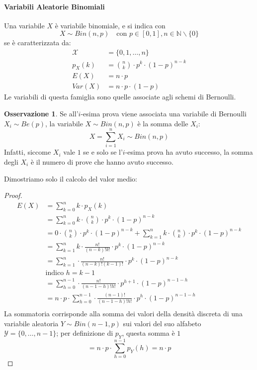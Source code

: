 \documentclass{article}
\theoremstyle{plain}
\theoremstyle{definition}
\newtheorem{osservazione}{Osservazione}[section]
\theoremstyle{remark}
\begin{document}
\paragraph{Variabili Aleatorie Binomiali} %
\label{par:variabili_aleatorie_binomiali}
Una variabile $X$ è variabile binomiale, e si indica con
\begin{equation*}
	X\sim Bin(n,p)\quad\text{con }p\in[0,1],n\in\mathds{N}\smallsetminus\{0\}
\end{equation*}
se è caratterizzata da:
\begin{align*}
	\mathcal{X}&=\{0,1,\dots,n\}\\
	p_X(k)&=\binom{n}{k}\cdot p^k\cdot (1-p)^{n-k}\\
	E(X)&=n\cdot p\\
	Var(X)&=n\cdot p\cdot(1-p)
\end{align*}
Le variabili di questa famiglia sono quelle associate agli schemi di Bernoulli.
\begin{osservazione}
	Se all'$i$-esima prova viene associata una variabile di Bernoulli $X_i\sim Be(p)$, la variabile $X\sim Bin(n,p)$ è la somma delle $X_i$:
	\begin{equation*}
		X=\sum_{i=1}^n X_i\sim Bin(n,p)
	\end{equation*}
	Infatti, siccome $X_i$ vale $1$ se e solo se l'$i$-esima prova ha avuto successo, la somma degli $X_i$ è il numero di prove che hanno avuto successo.
\end{osservazione}
Dimostriamo solo il calcolo del valor medio:
\begin{proof}
	\begin{align*}
		E(X)&=\sum_{k=0}^n k\cdot p_X(k)\\
		&=\sum_{k=0}^n k\cdot\binom{n}{k}\cdot p^k\cdot (1-p)^{n-k}\\
		&=0\cdot\binom{n}{k}\cdot p^k\cdot (1-p)^{n-k}+\sum_{k=1}^n k\cdot\binom{n}{k}\cdot p^k\cdot (1-p)^{n-k}\\
		&=\sum_{k=1}^n k\cdot\frac{n!}{(n-k)!k!}\cdot p^k\cdot (1-p)^{n-k}\\
		&=\sum_{k=1}^n \cdot\frac{n!}{(n-k)!(k-1)!}\cdot p^k\cdot (1-p)^{n-k}\\
		&\text{indico $h=k-1$}\\
		&=\sum_{h=0}^{n-1} \cdot\frac{n!}{(n-1-h)!h!}\cdot p^{h+1}\cdot (1-p)^{n-1-h}\\
		&=n\cdot p\cdot\sum_{h=0}^{n-1} \cdot\frac{(n-1)!}{(n-1-h)!h!}\cdot p^h\cdot (1-p)^{n-1-h}\\
	\end{align*}
	La sommatoria corrisponde alla somma dei valori della densità discreta di una variabile aleatoria $Y\sim Bin(n-1,p)$ sui valori del suo alfabeto $\mathcal{Y}=\{0,\dots,n-1\}$; per definizione di $p_Y$, questa somma è $1$
	\begin{equation*}
		=n\cdot p\cdot\sum_{h=0}^{n-1} p_Y(h)=n\cdot p
	\end{equation*}
\end{proof}
\end{document}
